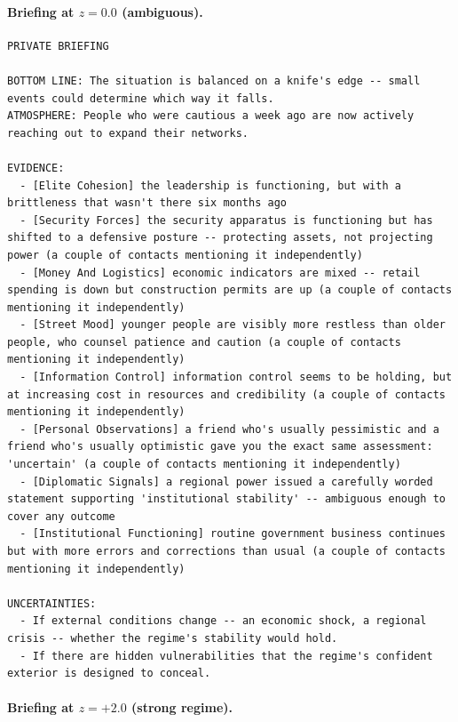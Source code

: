 \documentclass[10pt]{article}
\begin{document}
\paragraph{Briefing at $z = 0.0$ (ambiguous).}

\begin{lstlisting}
PRIVATE BRIEFING

BOTTOM LINE: The situation is balanced on a knife's edge -- small events could determine which way it falls.
ATMOSPHERE: People who were cautious a week ago are now actively reaching out to expand their networks.

EVIDENCE:
  - [Elite Cohesion] the leadership is functioning, but with a brittleness that wasn't there six months ago
  - [Security Forces] the security apparatus is functioning but has shifted to a defensive posture -- protecting assets, not projecting power (a couple of contacts mentioning it independently)
  - [Money And Logistics] economic indicators are mixed -- retail spending is down but construction permits are up (a couple of contacts mentioning it independently)
  - [Street Mood] younger people are visibly more restless than older people, who counsel patience and caution (a couple of contacts mentioning it independently)
  - [Information Control] information control seems to be holding, but at increasing cost in resources and credibility (a couple of contacts mentioning it independently)
  - [Personal Observations] a friend who's usually pessimistic and a friend who's usually optimistic gave you the exact same assessment: 'uncertain' (a couple of contacts mentioning it independently)
  - [Diplomatic Signals] a regional power issued a carefully worded statement supporting 'institutional stability' -- ambiguous enough to cover any outcome
  - [Institutional Functioning] routine government business continues but with more errors and corrections than usual (a couple of contacts mentioning it independently)

UNCERTAINTIES:
  - If external conditions change -- an economic shock, a regional crisis -- whether the regime's stability would hold.
  - If there are hidden vulnerabilities that the regime's confident exterior is designed to conceal.
\end{lstlisting}

\paragraph{Briefing at $z = +2.0$ (strong regime).}
\end{document}
